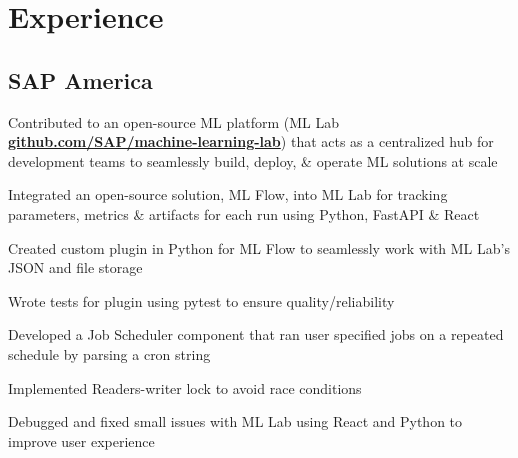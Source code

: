 \documentclass[]{deedy-resume-openfont}
\begin{document}
\begin{minipage}[t]{0.66\textwidth}


    \section{Experience}
    
    \subsection{SAP America}
    \vspace{\topsep} %
    \begin{tightemize}
        \item Contributed to an open-source ML platform (ML Lab \textbf{\href{https://github.com/SAP/machine-learning-lab}{github.com/SAP/machine-learning-lab}}) that acts as a centralized hub for development teams to seamlessly build, deploy, \& operate ML solutions at scale
        \item Integrated an open-source solution, ML Flow, into ML Lab for tracking parameters, metrics \& artifacts for each run using Python, FastAPI \& React
        \item Created custom plugin in Python for ML Flow to seamlessly work with ML Lab's JSON and file storage
        \item Wrote tests for plugin using pytest to ensure quality/reliability
        \item Developed a Job Scheduler component that ran user specified jobs on a repeated schedule by parsing a cron string
        \item Implemented Readers-writer lock to avoid race conditions
        \item Debugged and fixed small issues with ML Lab using React and Python to improve user experience
    \end{tightemize}
    \sectionsep


\end{minipage}
\end{document}

